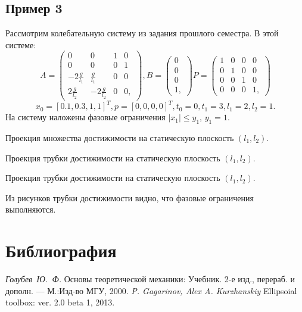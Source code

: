 \documentclass[12pt]{article}
\begin{document}
	\subsection{Пример 3}
		Рассмотрим колебательную систему из задания прошлого семестра. В этой системе:
	$$A =
	\begin{pmatrix}
		0 & 0 & 1 & 0 \\
		0 & 0 & 0 & 1 \\
		-2 \frac{g}{l_1} & \frac{g}{l_1} & 0 & 0 \\
		2 \frac{g}{l_2} & -2\frac{g}{l_2} & 0 & 0,
	\end{pmatrix}, 
	B = 
	\begin{pmatrix}
		0 \\
		0 \\
		0 \\ 
		1, 
	\end{pmatrix}
	P = 
	\begin{pmatrix}
		1 & 0 & 0 & 0 \\
		0 & 1 & 0 & 0\\
		0 & 0 & 1 & 0 \\
		0 & 0 & 0 & 1,
	\end{pmatrix}
	$$	
	$$
		x_0 = [0.1, 0.3, 1, 1]^{T}, p = [0, 0, 0, 0]^{T}, t_0 = 0, t_1 = 3, l_1 = 2, l_2 = 1.
	$$		
	На систему наложены фазовые ограничения $|x_1| \leqslant y_1$,  $y_1 = 1$.
	
	\begin{center}
		Проекция множества достижимости на статическую плоскость $(l_1, l_2)$.
	\end{center}		
	\begin{center}
		Проекция трубки достижимости на статическую плоскость $(l_1, l_2)$.
	\end{center}	
	\begin{center}
		Проекция трубки достижимости на статическую плоскость $(l_1, l_2)$.
	\end{center}	
	
	Из рисунков трубки достижимости видно, что фазовые ограничения выполняются.
\section{Библиография}
  \begin{thebibliography}{99}
     \emph{Голубев~Ю.~Ф.} Основы теоретической механики: Учебник. 2-е изд., перераб. и дополн. --- М.:Изд-во МГУ, 2000.
     \emph{P. Gagarinov, Alex A. Kurzhanskiy} Ellipsoial toolbox: ver. 2.0 beta 1, 2013.
  \end{thebibliography}
\end{document}
